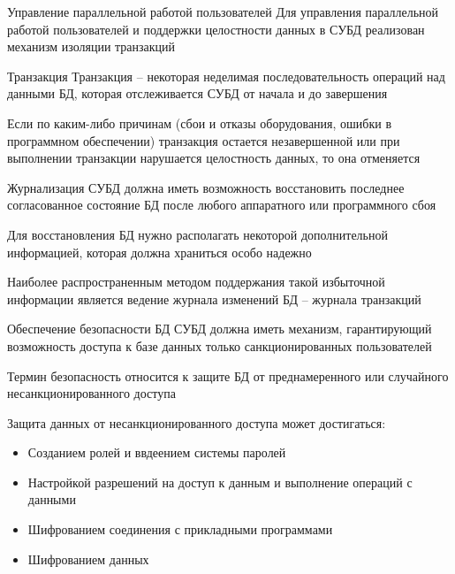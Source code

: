 \documentclass[12pt]{article}
\begin{document}
\begin{nota}{Управление параллельной работой пользователей}
    Для управления параллельной работой пользователей и поддержки целостности данных в СУБД реализован механизм изоляции транзакций
\end{nota}

\begin{defin}{Транзакция}
    Транзакция -- некоторая неделимая последовательность операций над данными БД, которая отслеживается СУБД от начала и до завершения

    Если по каким-либо причинам (сбои и отказы оборудования, ошибки в программном обеспечении) транзакция остается незавершенной или при выполнении транзакции нарушается целостность данных, то она отменяется
\end{defin}

\begin{defin}{Журнализация}
    СУБД должна иметь возможность восстановить последнее согласованное состояние БД после любого аппаратного или программного сбоя 

    Для восстановления БД нужно располагать некоторой дополнительной информацией, которая должна храниться особо надежно

    Наиболее распространенным методом поддержания такой избыточной информации является ведение журнала изменений БД -- журнала транзакций
\end{defin}

\begin{nota}{Обеспечение безопасности БД}
    СУБД должна иметь механизм, гарантирующий возможность доступа к базе данных только санкционированных пользователей

    Термин безопасность относится к защите БД от преднамеренного или случайного несанкционированного доступа

    Защита данных от несанкционированного доступа может достигаться:

    \begin{itemize}
        \item Созданием ролей и ввдеением системы паролей
        \item Настройкой разрешений на доступ к данным и выполнение операций с данными
        \item Шифрованием соединения с прикладными программами
        \item Шифрованием данных 
    \end{itemize}
\end{nota}
\end{document}
